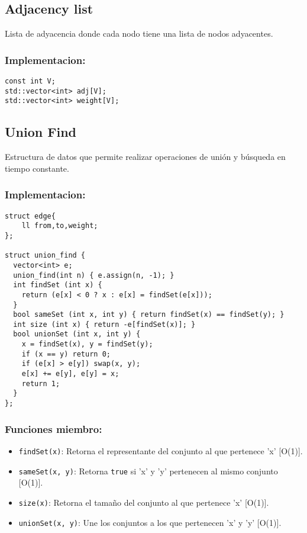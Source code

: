 \subsection{Adjacency list}
\label{subsec:adjacency_list}
Lista de adyacencia donde cada nodo tiene una lista de nodos adyacentes.

\subsubsection{Implementacion:}
\begin{lstlisting}[style=cpp]
const int V;
std::vector<int> adj[V];
std::vector<int> weight[V];
\end{lstlisting}

\subsection{Union Find}
\label{subsec:union_find}
Estructura de datos que permite realizar operaciones de unión y búsqueda en tiempo constante. 

\subsubsection{Implementacion:}
\begin{lstlisting}[style=cpp]
struct edge{
    ll from,to,weight;
};

struct union_find {
  vector<int> e;
  union_find(int n) { e.assign(n, -1); }
  int findSet (int x) { 
    return (e[x] < 0 ? x : e[x] = findSet(e[x]));
  }
  bool sameSet (int x, int y) { return findSet(x) == findSet(y); }
  int size (int x) { return -e[findSet(x)]; }
  bool unionSet (int x, int y) {
    x = findSet(x), y = findSet(y);
    if (x == y) return 0;
    if (e[x] > e[y]) swap(x, y);
    e[x] += e[y], e[y] = x;
    return 1;
  }
};
\end{lstlisting}

\subsubsection{Funciones miembro:}
\begin{itemize}
  \item \texttt{findSet(x)}: Retorna el representante del conjunto al que pertenece 'x' [O(1)].
  \item \texttt{sameSet(x, y)}: Retorna \texttt{true} si 'x' y 'y' pertenecen al mismo conjunto [O(1)].
  \item \texttt{size(x)}: Retorna el tamaño del conjunto al que pertenece 'x' [O(1)].
  \item \texttt{unionSet(x, y)}: Une los conjuntos a los que pertenecen 'x' y 'y' [O(1)].
\end{itemize}

